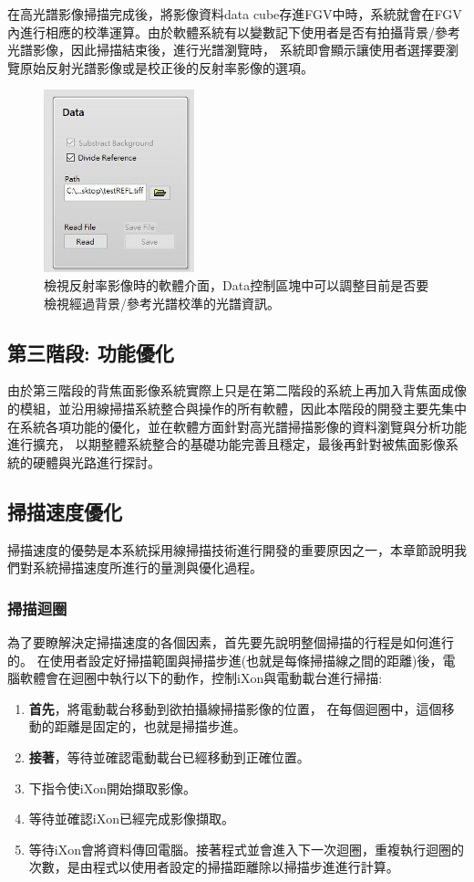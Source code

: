 \documentclass[12pt]{article}
\begin{document}
在高光譜影像掃描完成後，將影像資料data cube存進FGV中時，系統就會在FGV內進行相應的校準運算。由於軟體系統有以變數記下使用者是否有拍攝背景/參考光譜影像，因此掃描結束後，進行光譜瀏覽時，
系統即會顯示讓使用者選擇要瀏覽原始反射光譜影像或是校正後的反射率影像的選項。
\begin{figure}[ht]
    \centering
    \includegraphics[width=0.3\linewidth]{reflection.jpeg}
    \caption[檢視反射率影像時的軟體介面。]{檢視反射率影像時的軟體介面，Data控制區塊中可以調整目前是否要檢視經過背景/參考光譜校準的光譜資訊。}
    \label{figure: reflection}
\end{figure}

\subsection{第三階段: 功能優化}
由於第三階段的背焦面影像系統實際上只是在第二階段的系統上再加入背焦面成像的模組，並沿用線掃描系統整合與操作的所有軟體，因此本階段的開發主要先集中在系統各項功能的優化，並在軟體方面針對高光譜掃描影像的資料瀏覽與分析功能進行擴充，
以期整體系統整合的基礎功能完善且穩定，最後再針對被焦面影像系統的硬體與光路進行探討。

\subsection{掃描速度優化}
掃描速度的優勢是本系統採用線掃描技術進行開發的重要原因之一，本章節說明我們對系統掃描速度所進行的量測與優化過程。
\subsubsection{掃描迴圈}\label{sec: scan loop}
為了要瞭解決定掃描速度的各個因素，首先要先說明整個掃描的行程是如何進行的。
在使用者設定好掃描範圍與掃描步進(也就是每條掃描線之間的距離)後，電腦軟體會在迴圈中執行以下的動作，控制iXon與電動載台進行掃描:
\begin{enumerate}
    \item \textbf{首先}，將電動載台移動到欲拍攝線掃描影像的位置，
    在每個迴圈中，這個移動的距離是固定的，也就是掃描步進。
    \item \textbf{接著}，等待並確認電動載台已經移動到正確位置。
    \item 下指令使iXon開始擷取影像。
    \item 等待並確認iXon已經完成影像擷取。
    \item 等待iXon會將資料傳回電腦。接著程式並會進入下一次迴圈，重複執行迴圈的次數，是由程式以使用者設定的掃描距離除以掃描步進進行計算。
\end{enumerate}
\end{document}
